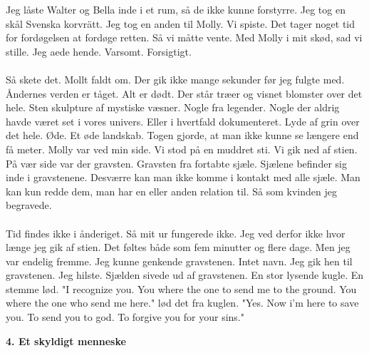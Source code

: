 \documentclass[]{article}
\begin{document}
Jeg låste Walter og Bella inde i et rum, så de ikke kunne forstyrre. Jeg tog en skål Svenska korvrätt. Jeg tog en anden til Molly. Vi spiste. Det tager noget tid for fordøgelsen at fordøge retten. Så vi måtte vente. Med Molly i mit skød, sad vi stille. Jeg aede hende. Varsomt. Forsigtigt. 
\\ \\
Så skete det. Mollt faldt om. Der gik ikke mange sekunder før jeg fulgte med. Åndernes verden er tåget. Alt er dødt. Der står træer og visnet blomster over det hele. Sten skulpture af mystiske væsner. Nogle fra legender. Nogle der aldrig havde været set i vores univers. Eller i hvertfald dokumenteret. Lyde af grin over det hele. Øde. Et øde landskab. Togen gjorde, at man ikke kunne se længere end få meter. Molly var ved min side. Vi stod på en muddret sti. Vi gik ned af stien. På vær side var der gravsten. Gravsten fra fortabte sjæle. Sjælene befinder sig inde i gravstenene. Desværre kan man ikke komme i kontakt med alle sjæle. Man kan kun redde dem, man har en eller anden relation til. Så som kvinden jeg begravede.
\\ \\
Tid findes ikke i ånderiget. Så mit ur fungerede ikke. Jeg ved derfor ikke hvor længe jeg gik af stien. Det føltes både som fem minutter og flere dage. Men jeg var endelig fremme. Jeg kunne genkende gravstenen. Intet navn. Jeg gik hen til gravstenen. Jeg hilste. Sjælden sivede ud af gravstenen. En stor lysende kugle. En stemme lød. "I recognize you. You where the one to send me to the ground. You where the one who send me here." lød det fra kuglen. "Yes. Now i'm here to save you. To send you to god. To forgive you for your sins."

\begin{center}
	\large\textbf{4. Et skyldigt menneske}
\end{center}
\end{document}
